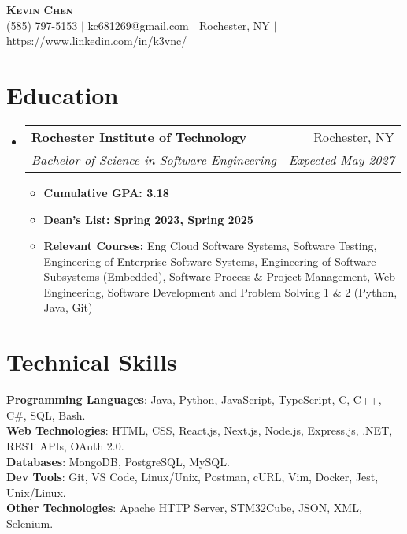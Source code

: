 \documentclass[letterpaper,11pt]{article}
\makeatletter
\newcommand{\resumeItem}[1]{
  \item\small{
    {#1 \vspace{-2pt}}
  }
}
\newcommand{\resumeSubheading}[4]{
  \vspace{-2pt}\item
    \begin{tabular*}{0.97\textwidth}[t]{l@{\extracolsep{\fill}}r}
      \textbf{#1} & #2 \\
      \textit{\small#3} & \textit{\small #4} \\
    \end{tabular*}\vspace{-7pt}
}
\newcommand{\resumeSubHeadingListStart}{\begin{itemize}[leftmargin=0.15in, label={}]}
\newcommand{\resumeSubHeadingListEnd}{\end{itemize}}
\newcommand{\resumeItemListStart}{\begin{itemize}}
\newcommand{\resumeItemListEnd}{\end{itemize}\vspace{-5pt}}
\makeatother
\begin{document}

\begin{center}
    \textbf{\Huge \scshape Kevin Chen} \\ \vspace{1pt}
    \small (585) 797-5153 $|$ kc681269@gmail.com $|$ Rochester, NY $|$ 
    https://www.linkedin.com/in/k3vnc/ 
\end{center}


\section{Education}
  \resumeSubHeadingListStart
    \resumeSubheading
      {Rochester Institute of Technology}{Rochester, NY}
      {Bachelor of Science in Software Engineering}{Expected May 2027}
      \resumeItemListStart
        \resumeItem{\textbf{Cumulative GPA: 3.18}}
        \resumeItem{\textbf{Dean's List: Spring 2023, Spring 2025}}
        \resumeItem{\textbf{Relevant Courses:} Eng Cloud Software Systems, Software Testing, Engineering of Enterprise Software Systems, Engineering of Software Subsystems (Embedded), Software Process \& Project Management, Web Engineering, Software Development and Problem Solving 1 \& 2 (Python, Java, Git)}
      \resumeItemListEnd
  \resumeSubHeadingListEnd

\section{Technical Skills}
\begin{itemize}[leftmargin=0.15in, label={}]
\small{\item{
\textbf{Programming Languages}{: Java, Python, JavaScript, TypeScript, C, C++, C\#, SQL, Bash.} \\
\textbf{Web Technologies}{: HTML, CSS, React.js, Next.js, Node.js, Express.js, .NET, REST APIs, OAuth 2.0.} \\
\textbf{Databases}{: MongoDB, PostgreSQL, MySQL.} \\
\textbf{Dev Tools}{: Git, VS Code, Linux/Unix, Postman, cURL, Vim, Docker, Jest, Unix/Linux.} \\
\textbf{Other Technologies}{: Apache HTTP Server, STM32Cube, JSON, XML, Selenium.}}}\\
\end{itemize}
\end{document}
